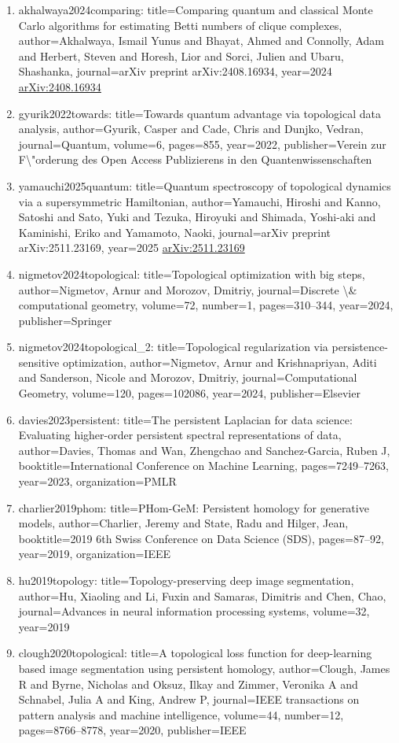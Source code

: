 \documentclass[11pt]{article}
\begin{document}
\begin{enumerate}[leftmargin=*]
  \item akhalwaya2024comparing: title=Comparing quantum and classical Monte Carlo algorithms for estimating Betti numbers of clique complexes, author=Akhalwaya, Ismail Yunus and Bhayat, Ahmed and Connolly, Adam and Herbert, Steven and Horesh, Lior and Sorci, Julien and Ubaru, Shashanka, journal=arXiv preprint arXiv:2408.16934, year=2024 \href{https://arxiv.org/abs/2408.16934}{arXiv:2408.16934}
  \item gyurik2022towards: title=Towards quantum advantage via topological data analysis, author=Gyurik, Casper and Cade, Chris and Dunjko, Vedran, journal=Quantum, volume=6, pages=855, year=2022, publisher=Verein zur F\textbackslash{}"orderung des Open Access Publizierens in den Quantenwissenschaften
  \item yamauchi2025quantum: title=Quantum spectroscopy of topological dynamics via a supersymmetric Hamiltonian, author=Yamauchi, Hiroshi and Kanno, Satoshi and Sato, Yuki and Tezuka, Hiroyuki and Shimada, Yoshi-aki and Kaminishi, Eriko and Yamamoto, Naoki, journal=arXiv preprint arXiv:2511.23169, year=2025 \href{https://arxiv.org/abs/2511.23169}{arXiv:2511.23169}
  \item nigmetov2024topological: title=Topological optimization with big steps, author=Nigmetov, Arnur and Morozov, Dmitriy, journal=Discrete \textbackslash{}\& computational geometry, volume=72, number=1, pages=310--344, year=2024, publisher=Springer
  \item nigmetov2024topological\_2: title=Topological regularization via persistence-sensitive optimization, author=Nigmetov, Arnur and Krishnapriyan, Aditi and Sanderson, Nicole and Morozov, Dmitriy, journal=Computational Geometry, volume=120, pages=102086, year=2024, publisher=Elsevier
  \item davies2023persistent: title=The persistent Laplacian for data science: Evaluating higher-order persistent spectral representations of data, author=Davies, Thomas and Wan, Zhengchao and Sanchez-Garcia, Ruben J, booktitle=International Conference on Machine Learning, pages=7249--7263, year=2023, organization=PMLR
  \item charlier2019phom: title=PHom-GeM: Persistent homology for generative models, author=Charlier, Jeremy and State, Radu and Hilger, Jean, booktitle=2019 6th Swiss Conference on Data Science (SDS), pages=87--92, year=2019, organization=IEEE
  \item hu2019topology: title=Topology-preserving deep image segmentation, author=Hu, Xiaoling and Li, Fuxin and Samaras, Dimitris and Chen, Chao, journal=Advances in neural information processing systems, volume=32, year=2019
  \item clough2020topological: title=A topological loss function for deep-learning based image segmentation using persistent homology, author=Clough, James R and Byrne, Nicholas and Oksuz, Ilkay and Zimmer, Veronika A and Schnabel, Julia A and King, Andrew P, journal=IEEE transactions on pattern analysis and machine intelligence, volume=44, number=12, pages=8766--8778, year=2020, publisher=IEEE
\end{enumerate}

% 
% 
\end{document}
